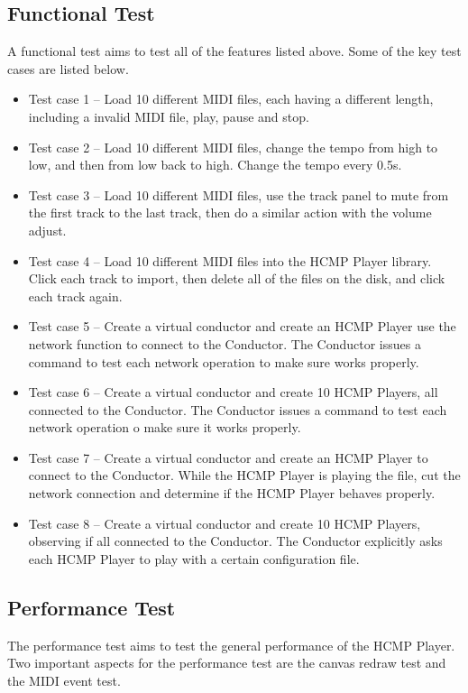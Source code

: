 \subsection{Functional Test}
A functional test aims to test all of the features listed above. Some of the 
key test cases are listed below.
\begin{itemize}
  \item Test case 1 -- Load 10 different MIDI files, each having a different
        length, including a invalid MIDI file, play, pause and stop. 
  \item Test case 2 -- Load 10 different MIDI files, change the tempo from high to 
        low, and then from low back to high. Change the tempo every 0.5s.
  \item Test case 3 -- Load 10 different MIDI files, use the track panel to mute
        from the first track to the last track, then do a similar action with the 
        volume adjust.
  \item Test case 4 -- Load 10 different MIDI files into the HCMP Player library. 
        Click each track to import, then delete all of the files on the disk, and 
        click each track again.  
  \item Test case 5 -- Create a virtual conductor and create an HCMP Player use  
        the network function to connect to the Conductor. The Conductor issues a command
        to test each network operation to make sure works properly. 
  \item Test case 6 -- Create a virtual conductor and create 10 HCMP Players, 
        all connected to the Conductor. The Conductor issues a command to test each network
        operation o make sure it works properly.
  \item Test case 7 -- Create a virtual conductor and create an HCMP Player 
        to connect to the Conductor. While the HCMP Player is playing the 
        file, cut the
        network connection and determine if the HCMP Player behaves properly.
  \item Test case 8 -- Create a virtual conductor and create 10 HCMP Players, observing
        if all connected to the Conductor. The Conductor explicitly asks each 
        HCMP Player to play with a certain configuration file.
\end{itemize}

\subsection{Performance Test}
The performance test aims to test the general performance of the HCMP Player. Two 
important aspects for the performance test are the canvas redraw test and the MIDI
event test. 

